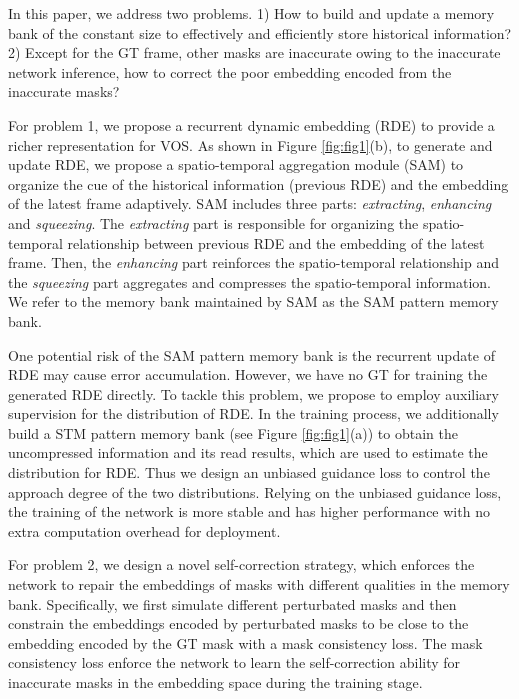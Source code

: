 \documentclass[10pt,twocolumn,letterpaper]{article}
\begin{document}
In this paper, we address two problems. 1) How to build and update a memory bank of the constant size to effectively and efficiently store historical information? 2) Except for the GT frame, other masks are inaccurate owing to the inaccurate network inference, how to correct the poor embedding encoded from the inaccurate masks?




For problem 1, 
we propose a recurrent dynamic embedding (RDE) to provide a richer representation for VOS. As shown in Figure \ref{fig:fig1}(b), to generate and update RDE, we propose a  spatio-temporal aggregation module (SAM) to organize the cue of the historical information (previous RDE) and the embedding of the latest frame adaptively. 
SAM includes three parts: \textit{extracting}, \textit{enhancing} and \textit{squeezing}. The \textit{extracting} part is responsible for organizing the spatio-temporal relationship between previous RDE and the embedding of the latest frame. Then, the \textit{enhancing} part reinforces the spatio-temporal relationship and the \textit{squeezing} part aggregates and compresses the spatio-temporal information. We refer to the memory bank maintained by SAM as the SAM pattern memory bank. 

One potential risk of the SAM pattern memory bank is the recurrent update of RDE may cause error accumulation. However, we have no GT for training the generated RDE directly. To tackle this problem, we propose to employ auxiliary supervision for the distribution of RDE. In the training process, we additionally build a STM pattern memory bank (see Figure \ref{fig:fig1}(a)) to obtain the uncompressed information and its read results, which are used to estimate the distribution for RDE. Thus we design an unbiased guidance loss to control the approach degree of the two distributions. Relying on the unbiased guidance loss, the training of the network is more stable and has higher performance with no extra computation overhead for deployment.



For problem 2, we design a novel self-correction strategy, which enforces the network to repair the embeddings of masks with different qualities in the memory bank. Specifically, we first simulate different perturbated masks and then constrain the embeddings encoded by perturbated masks to be close to the embedding encoded by the GT mask with a mask consistency loss. The mask consistency loss enforce the network to learn the self-correction ability for inaccurate masks in the embedding space during the training stage.
\end{document}
